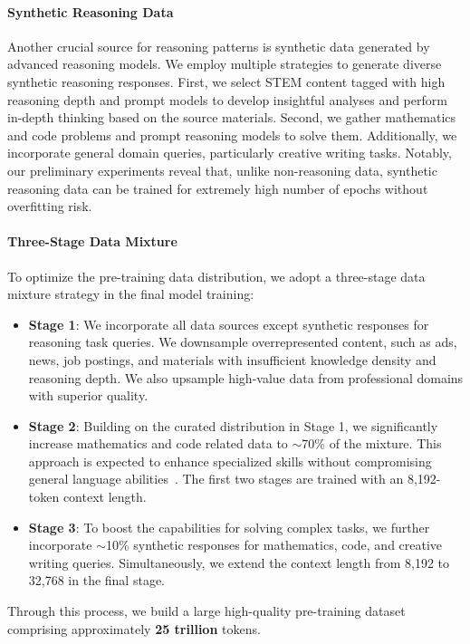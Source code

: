\documentclass[11pt, a4paper, logo, copyright, nonumbering]{xiaomi}
\begin{document}
\paragraph{Synthetic Reasoning Data}
Another crucial source for reasoning patterns is synthetic data generated by advanced reasoning models.
We employ multiple strategies to generate diverse synthetic reasoning responses.
First, we select STEM content tagged with high reasoning depth and prompt models to develop insightful analyses and perform in-depth thinking based on the source materials.
Second, we gather mathematics and code problems and prompt reasoning models to solve them.
Additionally, we incorporate general domain queries, particularly creative writing tasks.
Notably, our preliminary experiments reveal that, unlike non-reasoning data, synthetic reasoning data can be trained for extremely high number of epochs without overfitting risk.

\paragraph{Three-Stage Data Mixture} 
To optimize the pre-training data distribution, we adopt a three-stage data mixture strategy in the final model training:
\begin{itemize}
    \item \textbf{Stage 1}: We incorporate all data sources except synthetic responses for reasoning task queries. We downsample overrepresented content, such as ads, news, job postings, and materials with insufficient knowledge density and reasoning depth. We also upsample high-value data from professional domains with superior quality.
    \item \textbf{Stage 2}: Building on the curated distribution in Stage 1, we significantly increase mathematics and code related data to $\sim$70\% of the mixture. This approach is expected to enhance specialized skills without compromising general language abilities~\citep{zhu2024deepseek}. The first two stages are trained with an 8,192-token context length.
    \item \textbf{Stage 3}: To boost the capabilities for solving complex tasks, we further incorporate $\sim$10\% synthetic responses for mathematics, code, and creative writing queries. Simultaneously, we extend the context length from 8,192 to 32,768 in the final stage.
\end{itemize}


Through this process, we build a large high-quality pre-training dataset comprising approximately \textbf{25 trillion} tokens.
\end{document}
